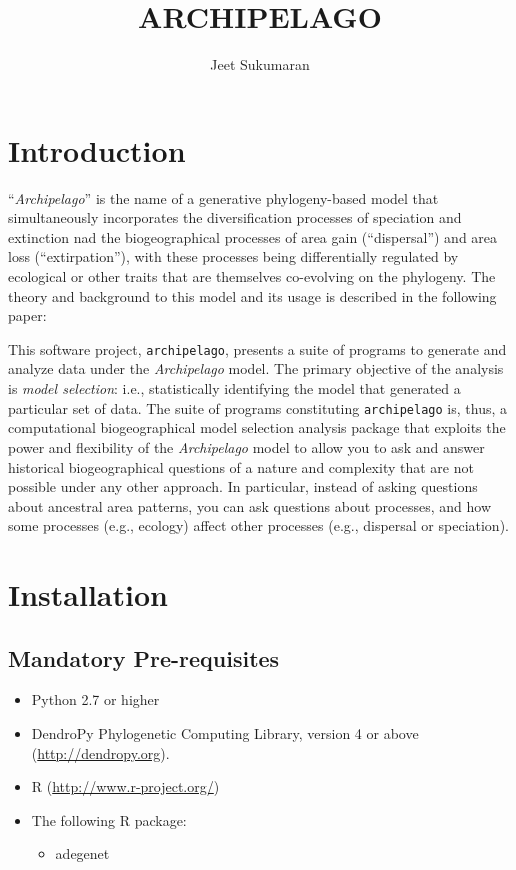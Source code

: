 \documentclass[11pt,openany]{memoir} %
\newcommand{\archipelagoModel}{\textit{Archipelago}\xspace}
\newcommand{\archipelagoPackage}{\texttt{archipelago}\xspace}
\begin{document}

\title{ARCHIPELAGO}
\author{Jeet Sukumaran}
\maketitle
{}

\tableofcontents

\chapter{Introduction}

``\archipelagoModel'' is the name of a generative phylogeny-based model that simultaneously incorporates the diversification processes of speciation and extinction nad the biogeographical processes of area gain (``dispersal'') and area loss (``extirpation''), with these processes being differentially regulated by ecological or other traits that are themselves co-evolving on the phylogeny.
The theory and background to this model and its usage is described in the following paper:


This software project, \archipelagoPackage, presents a suite of programs to generate and analyze data under the \archipelagoModel model.
The primary objective of the analysis is \textit{model selection}: i.e., statistically identifying the model that generated a particular set of data.
The suite of programs constituting \archipelagoPackage is, thus, a computational biogeographical model selection analysis package that exploits the power and flexibility of the \archipelagoModel model to allow you to ask and answer historical biogeographical questions of a nature and complexity that are not possible under any other approach.
In particular, instead of asking questions about ancestral area patterns, you can ask questions about processes, and how some processes (e.g., ecology) affect other processes (e.g., dispersal or speciation).

\chapter{Installation}

\section{Mandatory Pre-requisites}

\begin{itemize}
    \item Python 2.7 or higher
    \item DendroPy Phylogenetic Computing Library, version 4 or above (\url{http://dendropy.org}).
    \item R (\url{http://www.r-project.org/})
    \item The following R package:
    \begin{itemize}
        \item adegenet
    \end{itemize}
\end{itemize}
\end{document}
